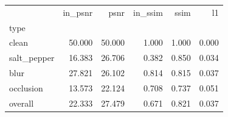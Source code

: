 \begin{tabular}{lrrrrr}
\toprule
 & in_psnr & psnr & in_ssim & ssim & l1 \\
type &  &  &  &  &  \\
\midrule
clean & 50.000 & 50.000 & 1.000 & 1.000 & 0.000 \\
salt_pepper & 16.383 & 26.706 & 0.382 & 0.850 & 0.034 \\
blur & 27.821 & 26.102 & 0.814 & 0.815 & 0.037 \\
occlusion & 13.573 & 22.124 & 0.708 & 0.737 & 0.051 \\
overall & 22.333 & 27.479 & 0.671 & 0.821 & 0.037 \\
\bottomrule
\end{tabular}
